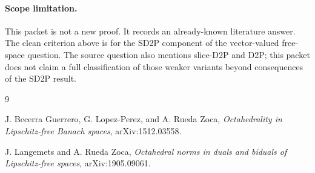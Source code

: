 \documentclass[11pt]{article}
\begin{document}
\paragraph{Scope limitation.}
This packet is not a new proof.  It records an already-known literature
answer.  The clean criterion above is for the SD2P component of the
vector-valued free-space question.  The source question also mentions slice-D2P
and D2P; this packet does not claim a full classification of those weaker
variants beyond consequences of the SD2P result.

\begin{thebibliography}{9}

J. Becerra Guerrero, G. Lopez-Perez, and A. Rueda Zoca,
\emph{Octahedrality in Lipschitz-free Banach spaces},
arXiv:1512.03558.

J. Langemets and A. Rueda Zoca,
\emph{Octahedral norms in duals and biduals of Lipschitz-free spaces},
arXiv:1905.09061.

\end{thebibliography}
\end{document}
